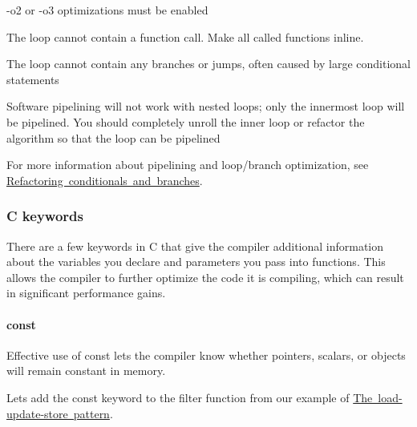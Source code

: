 \begin{DoxyItemize}
\item {\ttfamily -\/o2} or -\/{\ttfamily o3} optimizations must be enabled  
\item The loop cannot contain a function call. Make all called functions inline.  
\item The loop cannot contain any branches or jumps, often caused by large conditional statements  
\item Software pipelining will not work with nested loops; only the innermost loop will be pipelined. You should completely unroll the inner loop or refactor the algorithm so that the loop can be pipelined  
\end{DoxyItemize}

For more information about pipelining and loop/branch optimization, see \mbox{\hyperlink{a00832_subsection__refactoring_conditionals_and_branches}{Refactoring conditionals and branches}}.

\hypertarget{a00832_subsection__c_keywords}{}\subsubsection{C keywords}\label{a00832_subsection__c_keywords}
There are a few keywords in C that give the compiler additional information about the variables you declare and parameters you pass into functions. This allows the compiler to further optimize the code it is compiling, which can result in significant performance gains.

\hypertarget{a00832_subsubsection__const_}{}\paragraph{const}\label{a00832_subsubsection__const_}
 Effective use of {\ttfamily const} lets the compiler know whether pointers, scalars, or objects will remain constant in memory.

Let\textquotesingle{}s add the {\ttfamily const} keyword to the filter function from our example of \mbox{\hyperlink{a00832_subsection__the_loadupdatestore_pattern}{The load-\/update-\/store pattern}}.


